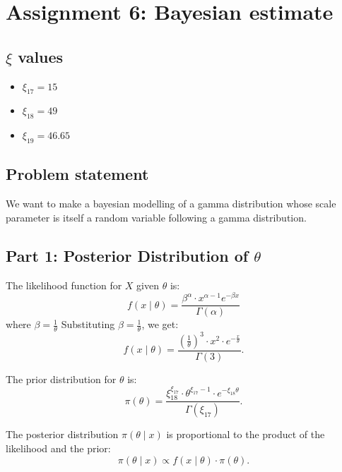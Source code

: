 \chapter{Assignment 6: Bayesian estimate}

\section*{$\xi$ values}

\begin{itemize}
\item $\xi_{17}=15$
\item $\xi_{18}=49$
\item $\xi_{19}=46.65$
\end{itemize}

\section{Problem statement}

We want to make a bayesian modelling of a gamma distribution whose scale parameter is itself a random variable following a gamma distribution.



\section*{Part 1: Posterior Distribution of $\theta$}

The likelihood function for $X$ given $\theta$ is:
\begin{equation}
f(x \mid \theta) = \frac{\beta^\alpha \cdot x^{\alpha-1} e^{-\beta x}}{\Gamma(\alpha)}
\end{equation}
where $\beta = \frac{1}{\theta}$
Substituting $\beta = \frac{1}{\theta}$, we get:
\begin{equation}
f(x \mid \theta) = \frac{\left(\frac{1}{\theta}\right)^3 \cdot x^2 \cdot e^{-\frac{x}{\theta}}}{\Gamma(3)}.
\end{equation}

The prior distribution for $\theta$ is:
\begin{equation}
\pi(\theta) = \frac{\xi_{18}^{\xi_{17}} \cdot \theta^{\xi_{17}-1} \cdot e^{-\xi_{18} \theta}}{\Gamma(\xi_{17})}.
\end{equation}

The posterior distribution $\pi(\theta \mid x)$ is proportional to the product of the likelihood and the prior:
\begin{equation}
\pi(\theta \mid x) \propto f(x \mid \theta) \cdot \pi(\theta).
\end{equation}

